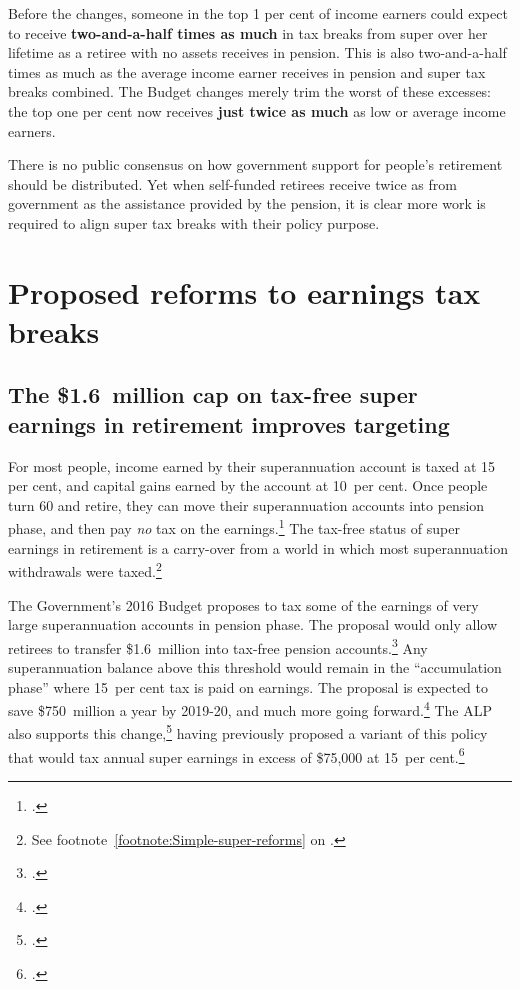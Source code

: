 \documentclass[continuous]{grattan}
\begin{document}
Before the changes, someone in the top 1 per cent of income earners could expect to receive \textbf{two-and-a-half times as much} in tax breaks from super over her lifetime as a retiree with no assets receives in pension. 
This is also two-and-a-half times as much as the average income earner receives in pension and super tax breaks combined. 
The Budget changes merely trim the worst of these excesses: the top one per cent now receives \textbf{just twice as much} as low or average income earners.

There is no public consensus on how government support for people's retirement should be distributed. 
Yet when self-funded retirees receive twice as from government as the assistance provided by the pension, it is clear more work is required to align super tax breaks with their policy purpose.

\chapter{{Proposed reforms to earnings tax breaks}}\label{chap:proposed-reforms-to-earnings-tax-breaks}

\section{The \$1.6~million cap on tax-free super earnings in retirement improves targeting}\label{sec:the-1.6-million-cap-on-tax-free-super-earnings-in-retirement-improves-targeting}
For most people, income earned by their superannuation account is taxed at 15 per cent, and capital gains earned by the account at 10~per cent. 
Once people turn 60 and retire, they can move their superannuation accounts into pension phase, and then pay \emph{no} tax on the earnings.\footcite[][13]{DaleyCoatesWoodEtAl2015Super} 
The tax-free status of super earnings in retirement is a carry-over from a world in which most superannuation withdrawals were taxed.\footnote{See footnote~\ref{footnote:Simple-super-reforms} on .}

The Government’s 2016 Budget proposes to tax some of the earnings of very large superannuation accounts in pension phase. 
The proposal would only allow retirees to transfer \$1.6~million into tax-free pension accounts.\footcite[][25]{BudgetPapers201617} %
Any superannuation balance above this threshold would remain in the “accumulation phase” where 15~per cent tax is paid on earnings. 
The proposal is expected to save \$750~million a year by 2019-20, and much more going forward.\footcite[][25]{BudgetPapers201617}
The ALP also supports this change,\footcite{Bowen-2016-Labors-plan-for-super-not-retrospective}  having previously proposed a variant of this policy that would tax annual super earnings in excess of \$75,000 at 15~per cent.\footcite{ALP2015FairerSuper} 
\end{document}
